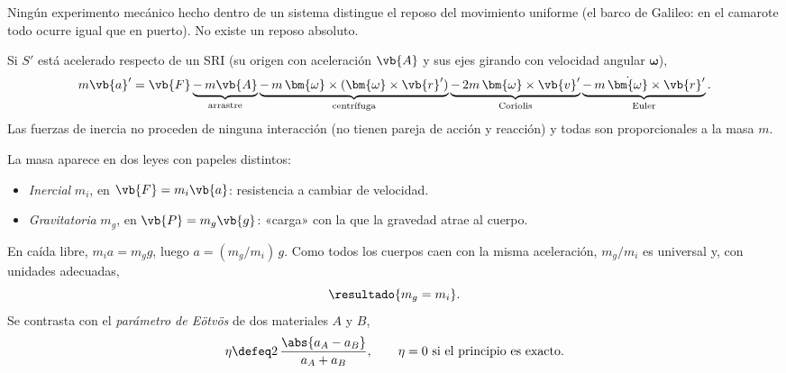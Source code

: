 \begin{observacion}
Ningún experimento mecánico hecho dentro de un sistema distingue el reposo del
movimiento uniforme (el barco de Galileo: en el camarote todo ocurre igual
que en puerto). No existe un reposo absoluto.
\end{observacion}

\begin{proposicion}
\label{prop:inercia}
Si $S'$ está acelerado respecto de un SRI (su origen con aceleración $\vb{A}$ y
sus ejes girando con velocidad angular $\bm{\omega}$),
\begin{equation}
  m\vb{a}'=\vb{F}
  \underbrace{-\,m\vb{A}}_{\text{arrastre}}
  \underbrace{-\,m\,\bm{\omega}\times(\bm{\omega}\times\vb{r}')}_{\text{centrífuga}}
  \underbrace{-\,2m\,\bm{\omega}\times\vb{v}'}_{\text{Coriolis}}
  \underbrace{-\,m\,\dot{\bm{\omega}}\times\vb{r}'}_{\text{Euler}} .
\end{equation}
Las fuerzas de inercia no proceden de ninguna interacción (no tienen pareja de
acción y reacción) y todas son proporcionales a la masa $m$.
\end{proposicion}

\begin{definicion}
La masa aparece en dos leyes con papeles distintos:
\begin{itemize}
  \item \emph{Inercial} $m_{i}$, en $\vb{F}=m_{i}\vb{a}$: resistencia a cambiar de velocidad.
  \item \emph{Gravitatoria} $m_{g}$, en $\vb{P}=m_{g}\vb{g}$: «carga» con la que la gravedad atrae al cuerpo.
\end{itemize}
\end{definicion}

\begin{proposicion}
\label{prop:equivalencia}
En caída libre, $m_{i}a=m_{g}g$, luego $a=(m_{g}/m_{i})\,g$. Como todos los cuerpos caen
con la misma aceleración, $m_{g}/m_{i}$ es universal y, con unidades adecuadas,
\begin{equation}
  \resultado{m_{g}=m_{i}} .
\end{equation}
Se contrasta con el \emph{parámetro de Eötvös} de dos materiales $A$ y $B$,
\begin{equation}
  \eta\defeq2\,\frac{\abs{a_{A}-a_{B}}}{a_{A}+a_{B}},
  \qquad \eta=0\ \text{si el principio es exacto}.
\end{equation}
\end{proposicion}

